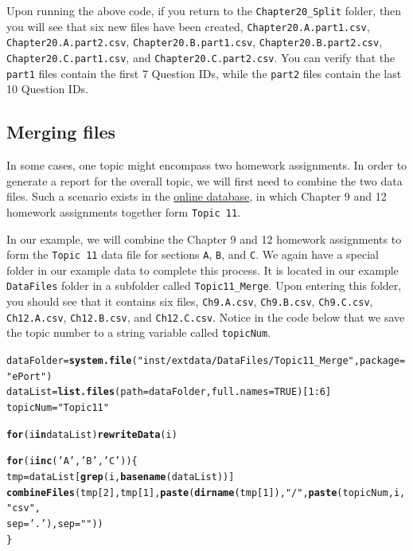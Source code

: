 \documentclass{article}\usepackage[]{graphicx}\usepackage[]{color}
\makeatletter
\newcommand{\hlnum}[1]{\textcolor[rgb]{0.686,0.059,0.569}{#1}}%
\newcommand{\hlstr}[1]{\textcolor[rgb]{0.192,0.494,0.8}{#1}}%
\newcommand{\hlopt}[1]{\textcolor[rgb]{0,0,0}{#1}}%
\newcommand{\hlstd}[1]{\textcolor[rgb]{0.345,0.345,0.345}{#1}}%
\newcommand{\hlkwa}[1]{\textcolor[rgb]{0.161,0.373,0.58}{\textbf{#1}}}%
\newcommand{\hlkwb}[1]{\textcolor[rgb]{0.69,0.353,0.396}{#1}}%
\newcommand{\hlkwc}[1]{\textcolor[rgb]{0.333,0.667,0.333}{#1}}%
\newcommand{\hlkwd}[1]{\textcolor[rgb]{0.737,0.353,0.396}{\textbf{#1}}}%
\newenvironment{kframe}{%
 \def\at@end@of@kframe{}%
 \ifinner\ifhmode%
  \def\at@end@of@kframe{\end{minipage}}%
  \begin{minipage}{\columnwidth}%
 \fi\fi%
 \def\FrameCommand##1{\hskip\@totalleftmargin \hskip-\fboxsep
 \colorbox{shadecolor}{##1}\hskip-\fboxsep
     \hskip-\linewidth \hskip-\@totalleftmargin \hskip\columnwidth}%
 \MakeFramed {\advance\hsize-\width
   \@totalleftmargin\z@ \linewidth\hsize
   \@setminipage}}%
 {\par\unskip\endMakeFramed%
 \at@end@of@kframe}
\newenvironment{knitrout}{}{} %
\numberwithin{equation}{section} %
\makeatother
\begin{document}
Upon running the above code, if you return to the \texttt{Chapter20\_Split} folder, then you will see that six new files have been created, \texttt{Chapter20.A.part1.csv}, \texttt{Chapter20.A.part2.csv}, \texttt{Chapter20.B.part1.csv}, \texttt{Chapter20.B.part2.csv}, \texttt{Chapter20.C.part1.csv}, and \texttt{Chapter20.C.part2.csv}. You can verify that the \texttt{part1} files contain the first 7 Question IDs, while the \texttt{part2} files contain the last 10 Question IDs.

\subsection{Merging files}

In some cases, one topic might encompass two homework assignments. In order to generate a report for the overall topic, we will first need to combine the two data files. Such a scenario exists in the \hyperref[sec:OnlineHomework]{online database}, in which Chapter 9 and 12 homework assignments together form \texttt{Topic 11}.

In our example, we will combine the Chapter 9 and 12 homework assignments to form the \texttt{Topic 11} data file for sections \texttt{A}, \texttt{B}, and \texttt{C}. We again have a special folder in our example data to complete this process. It is located in our example \texttt{DataFiles} folder in a subfolder called \texttt{Topic11\_Merge}. Upon entering this folder, you should see that it contains six files, \texttt{Ch9.A.csv}, \texttt{Ch9.B.csv}, \texttt{Ch9.C.csv}, \texttt{Ch12.A.csv}, \texttt{Ch12.B.csv}, and \texttt{Ch12.C.csv}. Notice in the code below that we save the topic number to a string variable called \texttt{topicNum}. \\

\begin{knitrout}
\color{fgcolor}\begin{kframe}
\begin{alltt}
\hlstd{dataFolder} \hlkwb{=} \hlkwd{system.file}\hlstd{(}\hlstr{"inst/extdata/DataFiles/Topic11_Merge"}\hlstd{,} \hlkwc{package}\hlstd{=}\hlstr{"ePort"}\hlstd{)}
\hlstd{dataList} \hlkwb{=} \hlkwd{list.files}\hlstd{(}\hlkwc{path} \hlstd{= dataFolder,} \hlkwc{full.names}\hlstd{=}\hlnum{TRUE}\hlstd{)[}\hlnum{1}\hlopt{:}\hlnum{6}\hlstd{]}
\hlstd{topicNum} \hlkwb{=} \hlstr{"Topic11"}

\hlkwa{for} \hlstd{(i} \hlkwa{in} \hlstd{dataList)} \hlkwd{rewriteData}\hlstd{(i)}

\hlkwa{for}\hlstd{(i} \hlkwa{in} \hlkwd{c}\hlstd{(}\hlstr{'A'}\hlstd{,} \hlstr{'B'}\hlstd{,} \hlstr{'C'}\hlstd{))\{}
  \hlstd{tmp} \hlkwb{=} \hlstd{dataList[}\hlkwd{grep}\hlstd{(i,} \hlkwd{basename}\hlstd{(dataList))]}
  \hlkwd{combineFiles}\hlstd{(tmp[}\hlnum{2}\hlstd{], tmp[}\hlnum{1}\hlstd{],} \hlkwd{paste}\hlstd{(}\hlkwd{dirname}\hlstd{(tmp[}\hlnum{1}\hlstd{]),} \hlstr{"/"}\hlstd{,} \hlkwd{paste}\hlstd{(topicNum, i,} \hlstr{"csv"}\hlstd{,}
    \hlkwc{sep} \hlstd{=} \hlstr{'.'}\hlstd{),} \hlkwc{sep} \hlstd{=} \hlstr{""}\hlstd{))}
\hlstd{\}}
\end{alltt}
\end{kframe}
\end{knitrout}
\end{document}
